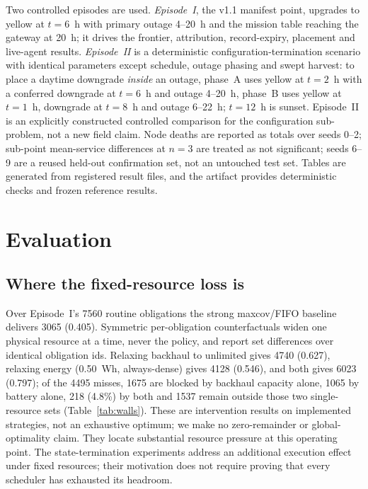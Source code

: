\documentclass[journal,10pt]{IEEEtran}
\begin{document}
Two controlled episodes are used. \emph{Episode~I}, the v1.1 manifest point, upgrades to yellow at
$t{=}6$~h with primary outage 4--20~h and the mission table reaching the gateway at 20~h; it drives
the frontier, attribution, record-expiry, placement and live-agent results. \emph{Episode~II} is a
deterministic configuration-termination scenario with identical parameters except schedule,
outage phasing and swept harvest: to place a daytime downgrade \emph{inside} an outage, phase~A
uses yellow at $t{=}2$~h with a conferred downgrade at $t{=}6$~h and outage 4--20~h, phase~B uses
yellow at $t{=}1$~h, downgrade at $t{=}8$~h and outage 6--22~h; $t{=}12$~h is sunset. Episode~II is
an explicitly constructed controlled comparison for the configuration sub-problem, not a new field
claim. Node deaths are reported as totals over seeds 0--2;
sub-point mean-service differences at $n{=}3$ are treated as not significant; seeds 6--9 are a
reused held-out confirmation set, not an untouched test set. Tables are generated from registered result files, and the artifact provides deterministic
checks and frozen reference results.

\section{Evaluation}
\label{sec:eval}

\subsection{Where the fixed-resource loss is}
\label{sec:eval-frontier}
Over Episode~I's 7560 routine obligations the strong maxcov/FIFO baseline delivers 3065 (0.405).
Symmetric per-obligation counterfactuals widen one physical resource at a time, never the policy,
and report set differences over identical obligation ids. Relaxing backhaul to unlimited gives
4740 (0.627), relaxing energy (0.50~Wh, always-dense) gives 4128 (0.546), and both gives 6023
(0.797); of the 4495 misses, 1675 are blocked by backhaul capacity alone, 1065 by battery alone,
218 (4.8\%) by both and 1537 remain outside those two single-resource sets
(Table~\ref{tab:walls}). These are intervention results on implemented strategies,
not an exhaustive optimum; we make no zero-remainder or global-optimality claim. They locate substantial resource pressure at this operating point. The state-termination
experiments address an additional execution effect under fixed resources; their motivation does
not require proving that every scheduler has exhausted its headroom.
\end{document}
